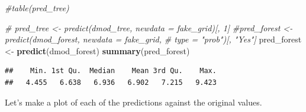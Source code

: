 \documentclass[]{article}
\newenvironment{Shaded}{\begin{snugshade}}{\end{snugshade}}
\newcommand{\KeywordTok}[1]{\textcolor[rgb]{0.13,0.29,0.53}{\textbf{{#1}}}}
\newcommand{\StringTok}[1]{\textcolor[rgb]{0.31,0.60,0.02}{{#1}}}
\newcommand{\CommentTok}[1]{\textcolor[rgb]{0.56,0.35,0.01}{\textit{{#1}}}}
\newcommand{\NormalTok}[1]{{#1}}
\begin{document}
\begin{Shaded}
\begin{Highlighting}[]
\CommentTok{#table(pred_tree)}

\CommentTok{# pred_tree <- predict(dmod_tree, newdata = fake_grid)[, 1]}
\CommentTok{#pred_forest <- predict(dmod_forest, newdata = fake_grid, }
\CommentTok{#                       type = "prob")[, "Yes"]}
\NormalTok{pred_forest <-}\StringTok{ }\KeywordTok{predict}\NormalTok{(dmod_forest)}
\KeywordTok{summary}\NormalTok{(pred_forest)}
\end{Highlighting}
\end{Shaded}

\begin{verbatim}
##    Min. 1st Qu.  Median    Mean 3rd Qu.    Max. 
##   4.455   6.638   6.936   6.902   7.215   9.423
\end{verbatim}

Let's make a plot of each of the predictions against the original
values.
\end{document}
